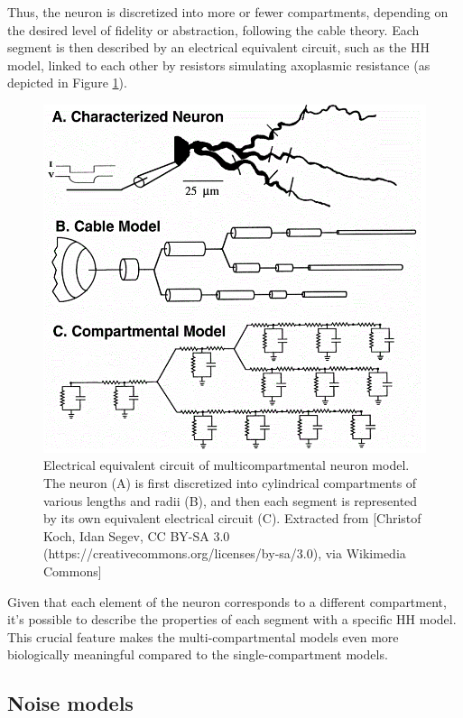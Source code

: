 Thus, the neuron is discretized into more or fewer compartments, depending on the desired level of fidelity or abstraction, following the cable theory. Each segment is then described by an electrical equivalent circuit, such as the HH model, linked to each other by resistors simulating axoplasmic resistance (as depicted in Figure \ref{fig:Multi-compartimental Model}).

\begin{figure}[ht!]
    \begin{center}
    \includegraphics[width=0.9\linewidth]{Figure/Multi-compartimental Model.jpg}
    \end{center}
    \caption{Electrical equivalent circuit of multicompartmental neuron model. The neuron (A) is first discretized into cylindrical compartments of various lengths and radii (B), and then each segment is represented by its own equivalent electrical circuit (C). Extracted from [Christof Koch, Idan Segev, CC BY-SA 3.0 (https://creativecommons.org/licenses/by-sa/3.0), via Wikimedia Commons]}
    \label{fig:Multi-compartimental Model}
\end{figure}

Given that each element of the neuron corresponds to a different compartment, it's possible to describe the properties of each segment with a specific HH model. This crucial feature makes the multi-compartmental models even more biologically meaningful compared to the single-compartment models.

\subsection{Noise models}


